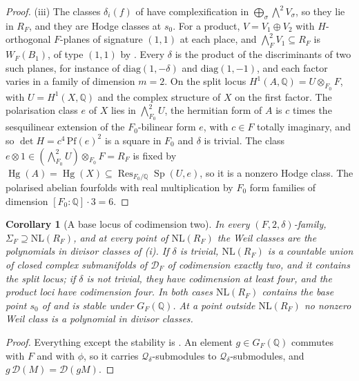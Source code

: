 \documentclass[11pt,reqno]{amsart}
\theoremstyle{plain}
\newtheorem{corollary}[theorem]{Corollary}
\theoremstyle{definition}
\theoremstyle{remark}
\newcommand{\QQ}{\mathbb{Q}}
\newcommand{\cD}{\mathcal{D}}
\newcommand{\cQ}{\mathcal{Q}}
\DeclareMathOperator{\Res}{Res}
\DeclareMathOperator{\Hg}{Hg}
\DeclareMathOperator{\Sp}{Sp}
\begin{document}
\begin{proof}
(iii) The classes $\delta_{i}(f)$ of \cite[Theorem~17.5(ii)]{paperI} have
complexification in $\bigoplus_{\sigma}\bigwedge^{2}V_{\sigma}$, so they lie in
$R_{F}$, and they are Hodge classes at $s_{0}$. For a product,
$V=V_{1}\oplus V_{2}$ with $H$-orthogonal $F$-planes of signature $(1,1)$ at
each place, and $\bigwedge^{2}_{F}V_{1}\subseteq R_{F}$ is $W_{F}(B_{1})$, of
type $(1,1)$ by \cite[Proposition~17.3(i)]{paperI}. Every $\delta$ is the product of the
discriminants of two such planes, for instance of $\mathrm{diag}(1,-\delta)$
and $\mathrm{diag}(1,-1)$, and each factor varies in a family of dimension
$m=2$. On the split locus $H^{1}(A,\QQ)=U\otimes_{F_{0}}F$, with
$U=H^{1}(X,\QQ)$ and the complex structure of $X$ on the first factor. The
polarisation class $e$ of $X$ lies in $\bigwedge^{2}_{F_{0}}U$, the hermitian
form of $A$ is $c$ times the sesquilinear extension of the $F_{0}$-bilinear
form $e$, with $c\in F$ totally imaginary, and so $\det H=c^{4}\,\mathrm{Pf}(e)^{2}$
is a square in $F_{0}$ and $\delta$ is trivial. The class
$e\otimes1\in(\bigwedge^{2}_{F_{0}}U)\otimes_{F_{0}}F=R_{F}$ is fixed by
$\Hg(A)=\Hg(X)\subseteq\Res_{F_{0}/\QQ}\Sp(U,e)$, so it is a nonzero Hodge
class. The polarised abelian fourfolds with real multiplication by $F_{0}$
form families of dimension $[F_{0}:\QQ]\cdot3=6$.
\end{proof}

\begin{corollary}[A base locus of codimension two]\label{cor:quarticbase}
In every $(F,2,\delta)$-family, $\Sigma_{F}\supseteq\mathrm{NL}(R_{F})$, and at
every point of $\mathrm{NL}(R_{F})$ the Weil classes are the polynomials in
divisor classes of (i). If $\delta$ is trivial,
$\mathrm{NL}(R_{F})$ is a countable union of closed complex submanifolds of
$\cD_{F}$ of codimension exactly two, and it contains the split locus; if
$\delta$ is not trivial, they have codimension at least four, and the product
loci have codimension four. In both cases $\mathrm{NL}(R_{F})$ contains the
base point $s_{0}$ of \cite[Theorem~17.5]{paperI} and is stable under
$G_{F}(\QQ)$. At a point outside $\mathrm{NL}(R_{F})$ no nonzero Weil class is
a polynomial in divisor classes.
\end{corollary}

\begin{proof}
Everything except the stability is . An element
$g\in G_{F}(\QQ)$ commutes with $F$ and with $\phi$, so it carries
$\cQ_{\delta}$-submodules to $\cQ_{\delta}$-submodules, and
$g\,\cD(M)=\cD(gM)$.
\end{proof}
\end{document}
